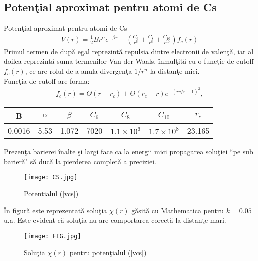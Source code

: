 \subsection{Poten\c{t}ial aproximat pentru atomi de Cs}
\begin{frame}[allowframebreaks]{Poten\c{t}ial aproximat pentru atomi de Cs}
\begin{align}
V(r)=\frac{1}{2}Br^\alpha e^{-\beta r}-\left(\frac{C_6}{r^6}+\frac{C_8}{r^8}+\frac{C_{10}}{r^{10}}\right)f_c(r) \label{vcs}
\end{align}
Primul termen de dup\u{a} egal reprezint\u{a} repulsia dintre electronii de valen\c{t}\u{a}, iar al doilea reprezint\u{a} suma termenilor Van der Waals, \^{i}nmul\c{t}it\u{a} cu o func\c{t}ie de cutoff $f_c(r)$, ce are rolul de a anula divergen\c{t}a $1/r^n$ la distan\c{t}e mici.\\
Func\c{t}ia de cutoff are forma:
\begin{align}
f_c(r)=\Theta(r-r_c)+\Theta(r_c-r)e^{-(rc/r-1)^2},
\end{align}
\begin{center}
 \begin{tabular}{||c c c c c c c||} 
 \hline
 B & $\alpha$ & $\beta$ & $C_6$ & $C_8$ & $C_{10}$ & $r_c$ \\ [0.5ex] 
 \hline 
 0.0016 & 5.53 & 1.072 & 7020 & $1.1 \times 10^6$ & $1.7 \times 10^8$ & 23.165 \\ 
  \hline
\end{tabular}
\end{center}
\newpage
Prezen\c{t}a barierei \^{i}nalte \c{s}i largi face ca la energii mici propagarea solu\c{t}iei ``pe sub barier\u{a}" s\u{a} duc\u{a} la pierderea complet\u{a} a preciziei.
\begin{figure}[h!]
  \centering
  \texttt{[image: CS.jpg]}
  {\caption{Potentialul (\ref{vcs})\label{gvcs}}}
  \end{figure}
  \^{I}n figur\u{a} este reprezentat\u a solu\c tia $\chi(r)$ g\u asit\u a cu Mathematica pentru $k=0.05$ u.a. Este evident c\u a solu\c tia nu are comportarea corect\u a la distan\c te mari.
\begin{figure}[h!]
  \centering
  \texttt{[image: FIG.jpg]}
  {\caption{Solu\c{t}ia $\chi(r)$ pentru poten\c{t}ialul (\ref{vcs})\label{figpsi}}}
  \end{figure}
  
\end{frame}

